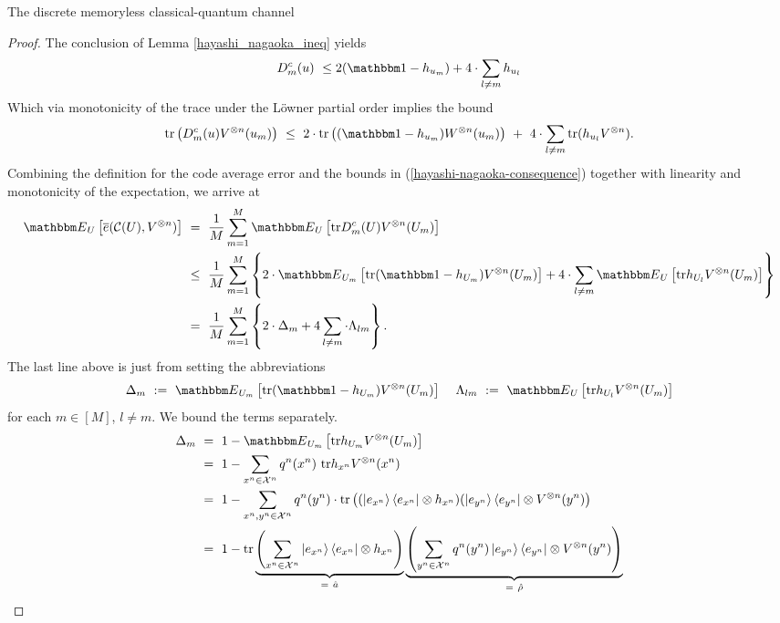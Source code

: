 \begin{section}{The discrete memoryless  classical-quantum channel}
\begin{proof}
	   The conclusion of Lemma \ref{hayashi_nagaoka_ineq} yields
		\begin{align*}
		 D^c_m(u) \ \leq 2 (\bbmeins - h_{u_m}) + 4 \cdot \sum_{l \neq m} h_{u_l} 
		\end{align*}
		Which via monotonicity of the trace under the L\"owner partial order implies the bound
		\begin{align}
		\tr\left(D_m^c(u)V^{\otimes n}(u_m)\right) \ 
		\leq \ 2 \cdot \tr\left((\bbmeins - h_{u_m})W^{\otimes n}(u_m)\right) \
		+ \ 4 \cdot \sum_{l \neq m} \tr(h_{u_l}V^{\otimes n}). \label{hayashi-nagaoka-consequence}
		\end{align}
	 	Combining the definition for the code average error and the bounds in (\ref{hayashi-nagaoka-consequence}) together with linearity and monotonicity of the expectation, we arrive at
		\begin{align}
		 \bbmE_{U}\left[\overline{e}(\cC(U), V^{\otimes n})\right] \ 
		 &=  \ \frac{1}{M} \sum_{m=1}^M \bbmE_{U}\left[\tr D_m^c(U) V^{\otimes n}(U_m)\right] \nonumber \\
		 &\leq  \ \frac{1}{M} \sum_{m=1}^M \left\{2 \cdot \bbmE_{U_m}\left[\tr(\bbmeins - h_{U_m})V^{\otimes n}(U_m)\right] + 4 \cdot \sum_{l \neq m} \bbmE_{U}\left[\tr h_{U_l}V^{\otimes n}(U_m) \right] \right\} \nonumber \\
		 &=  \ \frac{1}{M} \sum_{m=1}^M \left\{2 \cdot \Delta_m + 4 \sum_{l \neq m}\cdot \Lambda_{lm} \right\}. \label{hayashi-nagaoka-absch-0}
		\end{align}		
		The last line above is just from setting the abbreviations 
		\begin{align*}
		\Delta_m \ := \ \bbmE_{U_m}\left[\tr(\bbmeins - h_{U_m})V^{\otimes n}(U_m)\right] \hspace{.4cm} \Lambda_{lm} \ := \ \bbmE_{U}\left[\tr h_{U_l}V^{\otimes n}(U_m) \right]
		\end{align*}
  		for each $m \in [M]$, $l \neq m$. We bound the terms separately. 
  		\begin{align}
  		 \Delta_m \ 
  		 &= \ 1 - \bbmE_{U_m}\left[\tr h_{U_m} V^{\otimes n}(U_m) \right] \nonumber \\
  		 &= \ 1 - \sum_{x^n \in \cX^n} q^n(x^n) \ \tr h_{x^n}V^{\otimes n}(x^n) \nonumber \\
  		 &= \ 1 - \sum_{x^n,y^n \in \cX^n} q^n(y^n) \cdot \tr \left((\ket{e_{x^n}}\bra{e_{x^n}} \otimes h_{x^n})(\ket{e_{y^n}}\bra{e_{y^n}} \otimes V^{\otimes n}(y^n) \right) \nonumber \\
  		 &= \ 1 - \tr \underbrace{\left(\sum_{x^n \in \cX^n}\ket{e_{x^n}}\bra{e_{x^n}} \otimes h_{x^n}\right)}_{= \ \hat{a}} \underbrace{\left(\sum_{y^n \in \cX^n} q^n(y^n)\ket{e_{y^n}}\bra{e_{y^n}} \otimes V^{\otimes n}(y^n) \right)}_{= \ \hat{\rho}}  \nonumber \\ 

\end{align}
\end{proof}
\end{section}
